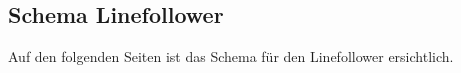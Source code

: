 \documentclass[../main.tex]{subfiles}
\begin{document}
\subsection{Schema Linefollower} 
\label{a4:Schema-Linefollower}

Auf den folgenden Seiten ist das Schema für den Linefollower ersichtlich.

% 





% 
\end{document}
